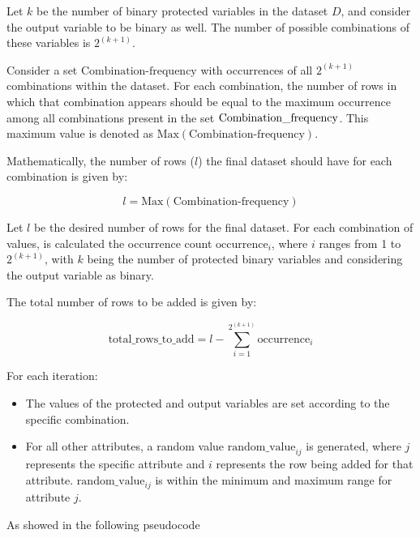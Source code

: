 \documentclass[12pt,a4paper,openright,twoside]{book}
\begin{document}
Let \( k \) be the number of binary protected variables in the dataset \( D \), and consider the output variable to be binary as well. The number of possible combinations of these variables is \( 2^{(k+1)} \).

Consider a set \( \text{Combination-frequency} \) with occurrences of all \( 2^{(k+1)} \) combinations within the dataset. For each combination, the number of rows in which that combination appears should be equal to the maximum occurrence among all combinations present in the set \( \text{Combination\textunderscore frequency} \). This maximum value is denoted as \( \text{Max}(\text{Combination-frequency}) \).

Mathematically, the number of rows (\( l \)) the final dataset should have for each combination is given by:

\[
l = \text{Max}(\text{Combination-frequency})
\]



Let \( l \) be the desired number of rows for the final dataset. For each combination of values, is calculated the occurrence count \( \text{occurrence}_i \), where \( i \) ranges from 1 to \( 2^{(k+1)} \), with \( k \) being the number of protected binary variables and considering the output variable as binary.

The total number of rows to be added is given by:

\[
\text{total\_rows\_to\_add} = l - \sum_{i=1}^{2^{(k+1)}} \text{occurrence}_i
\]

For each iteration:

\begin{itemize}

    \item The values of the protected and output variables are set according to the specific combination.
    
    \item For all other attributes, a random value \( \text{random\_value}_{ij} \) is generated, where \( j \) represents the specific attribute and \( i \) represents the row being added for that attribute. \( \text{random\_value}_{ij} \) is within the minimum and maximum range for attribute \( j \).

\end{itemize}

As showed in the following pseudocode
\end{document}
